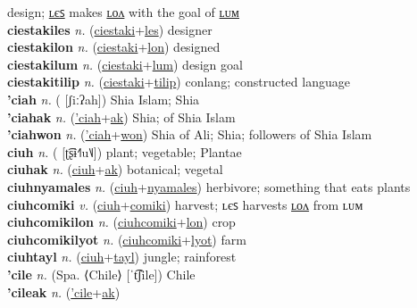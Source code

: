 design; \hyperref[ciestakiles]{ʟєꜱ} makes \hyperref[ciestakilon]{ʟᴏᴧ} with the goal of \hyperref[ciestakilum]{ʟᴜᴍ} \label{ciestaki} \\
\textbf{ciestakiles} \textit{n.} (\hyperref[ciestaki]{ciestaki}+\hyperref[les]{les})
designer \label{ciestakiles} \\
\textbf{ciestakilon} \textit{n.} (\hyperref[ciestaki]{ciestaki}+\hyperref[lon]{lon})
designed \label{ciestakilon} \\
\textbf{ciestakilum} \textit{n.} (\hyperref[ciestaki]{ciestaki}+\hyperref[lum]{lum})
design goal \label{ciestakilum} \\
\textbf{ciestakitilip} \textit{n.} (\hyperref[ciestaki]{ciestaki}+\hyperref[tilip]{tilip})
conlang; constructed language \label{ciestakitilip} \\
\textbf{'ciah} \textit{n.} ( [ʃiːʔah])
Shia Islam; Shia \label{'ciah} \\
\textbf{'ciahak} \textit{n.} (\hyperref['ciah]{'ciah}+\hyperref[ak]{ak})
Shia; of Shia Islam \label{'ciahak} \\
\textbf{'ciahwon} \textit{n.} (\hyperref['ciah]{'ciah}+\hyperref[won]{won})
Shia of Ali; Shia; followers of Shia Islam \label{'ciahwon} \\
\textbf{ciuh} \textit{n.} ( [ʈ͡ʂɨ˧˥u˥˩])
plant; vegetable; Plantae \label{ciuh} \\
\textbf{ciuhak} \textit{n.} (\hyperref[ciuh]{ciuh}+\hyperref[ak]{ak})
botanical; vegetal \label{ciuhak} \\
\textbf{ciuhnyamales} \textit{n.} (\hyperref[ciuh]{ciuh}+\hyperref[nyamales]{nyamales})
herbivore; something that eats plants \label{ciuhnyamales} \\
\textbf{ciuhcomiki} \textit{v.} (\hyperref[ciuh]{ciuh}+\hyperref[comiki]{comiki})
harvest; ʟєꜱ harvests \hyperref[ciuhcomikilon]{ʟᴏᴧ} from ʟᴜᴍ \label{ciuhcomiki} \\
\textbf{ciuhcomikilon} \textit{n.} (\hyperref[ciuhcomiki]{ciuhcomiki}+\hyperref[lon]{lon})
crop \label{ciuhcomikilon} \\
\textbf{ciuhcomikilyot} \textit{n.} (\hyperref[ciuhcomiki]{ciuhcomiki}+\hyperref[lyot]{lyot})
farm \label{ciuhcomikilyot} \\
\textbf{ciuhtayl} \textit{n.} (\hyperref[ciuh]{ciuh}+\hyperref[tayl]{tayl})
jungle; rainforest \label{ciuhtayl} \\
\textbf{'cile} \textit{n.} (Spa. ⟨Chile⟩ [ˈt͡ʃile])
Chile \label{'cile} \\
\textbf{'cileak} \textit{n.} (\hyperref['cile]{'cile}+\hyperref[ak]{ak})
